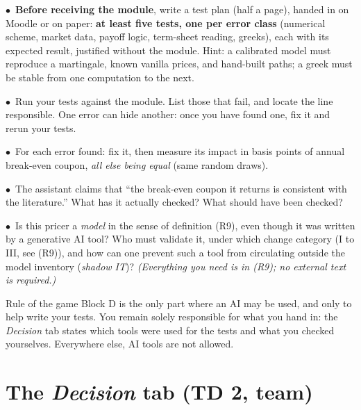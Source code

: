 \documentclass[11pt,a4paper]{article}
\newcommand{\team}{\textcolor{teamblue}{$\bullet$}}
\begin{document}
\begin{dquestions}
  \item \team\ \textbf{Before receiving the module}, write a test plan (half a page), handed in on Moodle or on
  paper: \textbf{at least five tests, one per error class} (numerical scheme, market data, payoff logic,
  term-sheet reading, greeks), each with its expected result, justified without the module. Hint:
  a calibrated model must reproduce a martingale, known vanilla prices, and hand-built paths; a
  greek must be stable from one computation to the next.

  \item \team\ Run your tests against the module. List those that fail, and locate the line responsible. One
  error can hide another: once you have found one, fix it and rerun your tests.

  \item \team\ For each error found: fix it, then measure its impact in basis points of annual break-even
  coupon, \emph{all else being equal} (same random draws).

  \item \team\ The assistant claims that ``the break-even coupon it returns is consistent with the literature.''
  What has it actually checked? What should have been checked?

  \item \team\ Is this pricer a \emph{model} in the sense of definition (R9), even though it was written by a generative
  AI tool? Who must validate it, under which change category (I to III, see (R9)), and how can
  one prevent such a tool from circulating outside the model inventory (\emph{shadow IT})? \emph{(Everything
  you need is in (R9); no external text is required.)}
\end{dquestions}

\begin{navybox}{Rule of the game}
Block D is the only part where an AI may be used, and only to help write your tests. You remain
solely responsible for what you hand in: the \emph{Decision} tab states which tools were used for the tests
and what you checked yourselves. Everywhere else, AI tools are not allowed.
\end{navybox}

\section{The \emph{Decision} tab (TD 2, team)}
\end{document}
